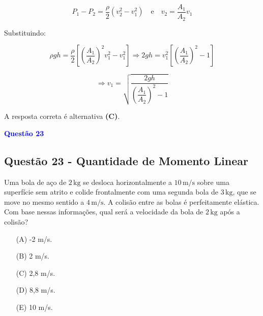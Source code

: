 \begin{flushleft}
\[
P_1 - P_2 = \frac{\rho}{2}(v_2^2 - v_1^2) \quad \text{e} \quad v_2 = \frac{A_1}{A_2} v_1
\]

Substituindo:

\[
\rho g h = \frac{\rho}{2} \left[ \left( \frac{A_1}{A_2} \right)^2 v_1^2 - v_1^2 \right]
\Rightarrow 2gh = v_1^2 \left[ \left( \frac{A_1}{A_2} \right)^2 - 1 \right]
\]

\[
\Rightarrow v_1 = \sqrt{ \frac{2gh}{\left( \dfrac{A_1}{A_2} \right)^2 - 1} }
\]

A resposta correta é alternativa \colorbox{green!50}{\textbf{(C)}}.

\end{flushleft}

\begin{flushleft}
\textbf{\textcolor{blue}{\Large Quest\~ao 23}}\\
\subsection{Quest\~ao 23 - Quantidade de Momento Linear}
Uma bola de aço de \(2\,\text{kg}\) se desloca horizontalmente a \(10\,\text{m/s}\) sobre uma 
superfície sem atrito e colide frontalmente com uma segunda bola de \(3\,\text{kg}\), que se move 
no mesmo sentido a \(4\,\text{m/s}\). A colisão entre as bolas é perfeitamente elástica. Com base nessas 
informações, qual será a velocidade da bola de \(2\,\text{kg}\) após a colisão?


\begin{itemize}
\item[(A)] -2 m/s.
\item[(B)]  2 m/s.
\item[(C)]  2,8 m/s.
\item[(D)]  8,8 m/s.
\item[(E)]  10 m/s.
\end{itemize}

\vspace{0.5cm}

\begin{center}
\end{center}
\end{flushleft}
